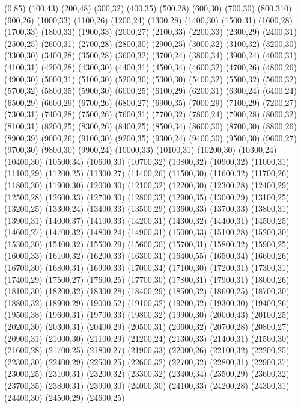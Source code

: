 (0,85)
(100,43)
(200,48)
(300,32)
(400,35)
(500,28)
(600,30)
(700,30)
(800,310)
(900,26)
(1000,33)
(1100,26)
(1200,24)
(1300,28)
(1400,30)
(1500,31)
(1600,28)
(1700,33)
(1800,33)
(1900,33)
(2000,27)
(2100,33)
(2200,33)
(2300,29)
(2400,31)
(2500,25)
(2600,31)
(2700,28)
(2800,30)
(2900,25)
(3000,32)
(3100,32)
(3200,30)
(3300,30)
(3400,28)
(3500,28)
(3600,32)
(3700,24)
(3800,34)
(3900,24)
(4000,31)
(4100,31)
(4200,28)
(4300,30)
(4400,31)
(4500,34)
(4600,32)
(4700,26)
(4800,26)
(4900,30)
(5000,31)
(5100,30)
(5200,30)
(5300,30)
(5400,32)
(5500,32)
(5600,32)
(5700,32)
(5800,35)
(5900,30)
(6000,25)
(6100,29)
(6200,31)
(6300,24)
(6400,24)
(6500,29)
(6600,29)
(6700,26)
(6800,27)
(6900,35)
(7000,29)
(7100,29)
(7200,27)
(7300,31)
(7400,28)
(7500,26)
(7600,31)
(7700,32)
(7800,24)
(7900,28)
(8000,32)
(8100,31)
(8200,25)
(8300,26)
(8400,25)
(8500,34)
(8600,30)
(8700,30)
(8800,26)
(8900,39)
(9000,26)
(9100,30)
(9200,35)
(9300,24)
(9400,30)
(9500,30)
(9600,27)
(9700,30)
(9800,30)
(9900,24)
(10000,33)
(10100,31)
(10200,30)
(10300,24)
(10400,30)
(10500,34)
(10600,30)
(10700,32)
(10800,32)
(10900,32)
(11000,31)
(11100,29)
(11200,25)
(11300,27)
(11400,26)
(11500,30)
(11600,32)
(11700,26)
(11800,30)
(11900,30)
(12000,30)
(12100,32)
(12200,30)
(12300,28)
(12400,29)
(12500,28)
(12600,33)
(12700,30)
(12800,33)
(12900,35)
(13000,29)
(13100,25)
(13200,25)
(13300,24)
(13400,33)
(13500,29)
(13600,33)
(13700,33)
(13800,31)
(13900,31)
(14000,37)
(14100,33)
(14200,31)
(14300,32)
(14400,31)
(14500,25)
(14600,27)
(14700,32)
(14800,24)
(14900,31)
(15000,33)
(15100,28)
(15200,30)
(15300,30)
(15400,32)
(15500,29)
(15600,30)
(15700,31)
(15800,32)
(15900,25)
(16000,33)
(16100,32)
(16200,33)
(16300,31)
(16400,55)
(16500,34)
(16600,26)
(16700,30)
(16800,31)
(16900,33)
(17000,34)
(17100,30)
(17200,31)
(17300,31)
(17400,29)
(17500,27)
(17600,25)
(17700,30)
(17800,31)
(17900,31)
(18000,26)
(18100,30)
(18200,32)
(18300,28)
(18400,29)
(18500,32)
(18600,25)
(18700,30)
(18800,32)
(18900,29)
(19000,52)
(19100,32)
(19200,32)
(19300,30)
(19400,26)
(19500,38)
(19600,31)
(19700,33)
(19800,32)
(19900,30)
(20000,43)
(20100,25)
(20200,30)
(20300,31)
(20400,29)
(20500,31)
(20600,32)
(20700,28)
(20800,27)
(20900,31)
(21000,30)
(21100,29)
(21200,24)
(21300,33)
(21400,31)
(21500,30)
(21600,28)
(21700,25)
(21800,27)
(21900,33)
(22000,26)
(22100,32)
(22200,25)
(22300,30)
(22400,29)
(22500,25)
(22600,32)
(22700,32)
(22800,31)
(22900,37)
(23000,25)
(23100,31)
(23200,32)
(23300,32)
(23400,34)
(23500,29)
(23600,32)
(23700,35)
(23800,31)
(23900,30)
(24000,30)
(24100,33)
(24200,28)
(24300,31)
(24400,30)
(24500,29)
(24600,25)

